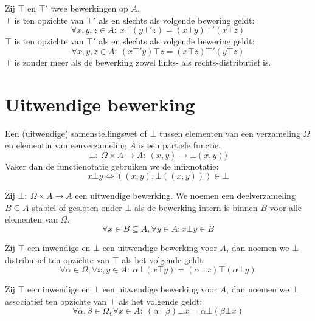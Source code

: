 \documentclass[main.tex]{subfiles}
\begin{document}
\begin{de}
  Zij $\top$ en $\top'$ twee bewerkingen op $A$.\\
  $\top$ is  ten opzichte van $\top'$ als en slechts als volgende bewering geldt:
  \[ \forall x,y,z \in A:\ x \top (y \top' z) = (x\top y) \top' (x \top z)\]
  $\top$ is  ten opzichte van $\top'$ als en slechts als volgende bewering geldt:
  \[ \forall x,y,z \in A:\ (x \top' y) \top z = (x\top z) \top' (y \top z)\]
  $\top$ is zonder meer  als de bewerking zowel links- als rechts-distributief is.
\end{de}

\section{Uitwendige bewerking}
\label{sec:uitwendige-bewerking}

\begin{de}
  Een (uitwendige) samenstellingswet of  $\bot$ tussen elementen van een verzameling $\Omega$ en elementin van eenverzameling $A$ is een partiele functie.
  \[ \bot:\ \Omega\times A \rightarrow A:\ (x,y) \rightarrow \bot(x,y)) \]
  Vaker dan de functienotatie gebruiken we de infixnotatie:
  \[ x \bot y \Leftrightarrow  ((x,y),\bot((x,y))) \in \bot \]
\end{de}

\begin{de}
  Zij $\bot:\ \Omega\times A\rightarrow A$ een uitwendige bewerking.
  We noemen een deelverzameling $B\subseteq A$ stabiel of gesloten onder $\bot$ als de bewerking intern is binnen $B$ voor alle elementen van $\Omega$.
  \[ \forall x\in B\subseteq A, \forall y \in A: x \bot y \in B \]
\end{de}

\begin{de}
  Zij $\top$ een inwendige en $\bot$ een uitwendige bewerking voor $A$, dan noemen we $\bot$ distributief ten opzichte van $\top$ als het volgende geldt:
  \[ \forall \alpha \in \Omega, \forall x,y \in A:\ \alpha\bot(x\top y) = (\alpha \bot x)\top(\alpha \bot y) \]
\end{de}

\begin{de}
  Zij $\top$ een inwendige en $\bot$ een uitwendige bewerking voor $A$, dan noemen we $\bot$ associatief ten opzichte van $\top$ als het volgende geldt:
  \[ \forall \alpha,\beta\in \Omega, \forall x \in A:\ (\alpha \top \beta) \bot x = \alpha \bot (\beta \bot x) \]
\end{de}
\end{document}
